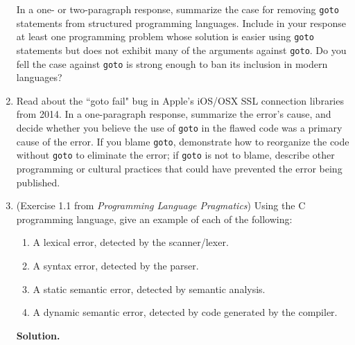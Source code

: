 \documentclass[9pt]{article}
\begin{document}
\begin{enumerate}
         In a one- or two-paragraph response, summarize the case for removing
         \verb|goto| statements from structured programming languages. Include
         in your response at least one programming problem whose solution is
         easier using \verb|goto| statements but does not exhibit many of the
         arguments against \verb|goto|. Do you fell the case against \verb|goto|
         is strong enough to ban its inclusion in modern languages?
   \item Read about the ``goto fail" bug in Apple's iOS/OSX SSL connection
         libraries from 2014. In a one-paragraph response, summarize the error's
         cause, and decide whether you believe the use of \verb|goto| in the
         flawed code was a primary cause of the error. If you blame \verb|goto|,
         demonstrate how to reorganize the code without \verb|goto| to eliminate
         the error; if \verb|goto| is not to blame, describe other programming
         or cultural practices that could have prevented the error being
         published.
   \item (Exercise 1.1 from \textit{Programming Language Pragmatics}) Using the
         C programming language, give an example of each of the following:

         \begin{enumerate}
            \item A lexical error, detected by the scanner/lexer.
            \item A syntax error, detected by the parser.
            \item A static semantic error, detected by semantic analysis.
            \item A dynamic semantic error, detected by code generated by the
                  compiler.
         \end{enumerate}

      \textbf{Solution.}


\end{enumerate}
\end{document}
